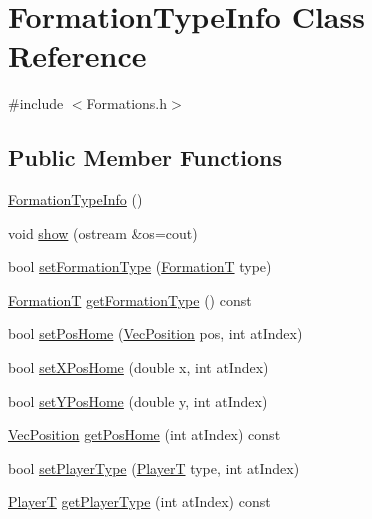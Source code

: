 \hypertarget{classFormationTypeInfo}{}\section{Formation\+Type\+Info Class Reference}
\label{classFormationTypeInfo}


{\ttfamily \#include $<$Formations.\+h$>$}

\subsection*{Public Member Functions}
\begin{DoxyCompactItemize}
\item 
\hyperlink{classFormationTypeInfo_a6cc97e2eefc63bfa2fed24d22845e5b1}{Formation\+Type\+Info} ()
\item 
void \hyperlink{classFormationTypeInfo_a073e49de1ee750c4b84b50c2d80bf2fa}{show} (ostream \&os=cout)
\item 
bool \hyperlink{classFormationTypeInfo_a0fcee6c47ac6aa4757b93d0fd3db9523}{set\+Formation\+Type} (\hyperlink{SoccerTypes_8h_ac803bd9e3400705765031836994a385d}{FormationT} type)
\item 
\hyperlink{SoccerTypes_8h_ac803bd9e3400705765031836994a385d}{FormationT} \hyperlink{classFormationTypeInfo_ace4194c4963192814d8cb51dbca77a1f}{get\+Formation\+Type} () const 
\item 
bool \hyperlink{classFormationTypeInfo_a457b72b71aee22843f7a5ef95a015e8c}{set\+Pos\+Home} (\hyperlink{classVecPosition}{Vec\+Position} pos, int at\+Index)
\item 
bool \hyperlink{classFormationTypeInfo_a3be9863c90a991d7525d911c43c7bb5a}{set\+X\+Pos\+Home} (double x, int at\+Index)
\item 
bool \hyperlink{classFormationTypeInfo_a76641da64e29137b142a9a5a4bb1657e}{set\+Y\+Pos\+Home} (double y, int at\+Index)
\item 
\hyperlink{classVecPosition}{Vec\+Position} \hyperlink{classFormationTypeInfo_a7df5f712623d4c33b3b21d591ed35404}{get\+Pos\+Home} (int at\+Index) const 
\item 
bool \hyperlink{classFormationTypeInfo_a5dc596bd06680f99becf797dae6bf558}{set\+Player\+Type} (\hyperlink{SoccerTypes_8h_a88daf580b042467ccd4098107cffc718}{PlayerT} type, int at\+Index)
\item 
\hyperlink{SoccerTypes_8h_a88daf580b042467ccd4098107cffc718}{PlayerT} \hyperlink{classFormationTypeInfo_a4e240cd93fd7cffd04aa6021ca9ffa57}{get\+Player\+Type} (int at\+Index) const 

\end{DoxyCompactItemize}
